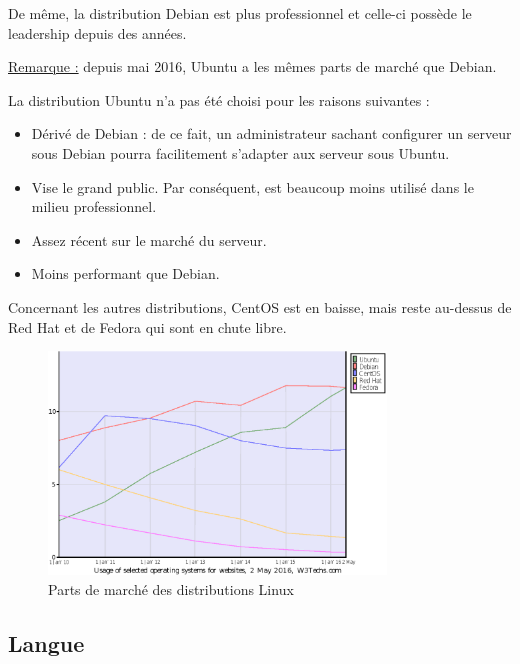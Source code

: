 \newpage

De même, la distribution Debian est plus professionnel et celle-ci possède le
leadership depuis des années.

\underline{Remarque :} depuis mai 2016, Ubuntu a les mêmes parts de marché que
Debian.

La distribution Ubuntu n'a pas été choisi pour les raisons suivantes :
\begin{itemize}
\item Dérivé de Debian : de ce fait, un administrateur sachant configurer un
serveur sous Debian pourra facilitement s'adapter aux serveur sous Ubuntu.

\item Vise le grand public. Par conséquent, est beaucoup moins utilisé dans le
milieu professionnel.

\item Assez récent sur le marché du serveur.

\item Moins performant que Debian.
\end{itemize}

Concernant les autres distributions, CentOS est en baisse, mais reste au-dessus
de Red Hat et de Fedora qui sont en chute libre.

\begin{figure}[h]
  \centering
  \includegraphics[width=0.8\textwidth]
  {textures/images/installation/distributions.eps}
  \caption{Parts de marché des distributions Linux}
\end{figure}

\newpage

\subsection{Langue}
\label{subsec:langue}

